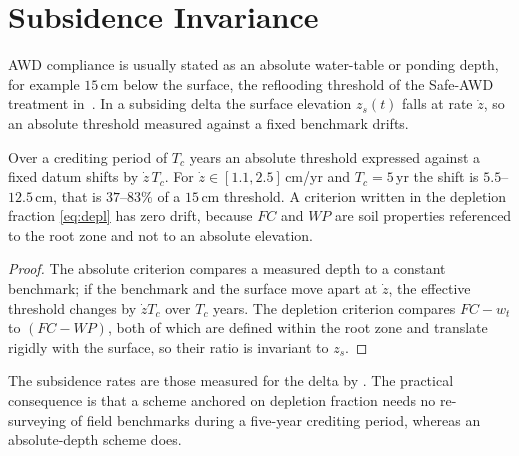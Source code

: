 \section{Subsidence Invariance}
\label{sec:subsidence}

AWD compliance is usually stated as an absolute water-table or ponding depth,
for example $15$\,cm below the surface, the reflooding threshold of the Safe-AWD
treatment in~\cite{balaine2019}. In a subsiding delta
the surface elevation $z_s(t)$ falls at rate $\dot z$, so an absolute threshold
measured against a fixed benchmark drifts.

\begin{proposition}
\label{prop:subsid}
Over a crediting period of $T_c$ years an absolute threshold expressed against
a fixed datum shifts by $\dot z\,T_c$. For $\dot z\in[1.1,2.5]$\,cm/yr and
$T_c=5$\,yr the shift is $5.5$--$12.5$\,cm, that is $37$--$83\%$ of a
$15$\,cm threshold. A criterion written in the depletion fraction
\eqref{eq:depl} has zero drift, because $FC$ and $WP$ are soil properties
referenced to the root zone and not to an absolute elevation.
\end{proposition}

\begin{proof}
The absolute criterion compares a measured depth to a constant benchmark; if
the benchmark and the surface move apart at $\dot z$, the effective threshold
changes by $\dot z T_c$ over $T_c$ years. The depletion criterion compares
$FC-w_t$ to $(FC-WP)$, both of which are defined within the root zone and
translate rigidly with the surface, so their ratio is invariant to $z_s$.
\end{proof}

The subsidence rates are those measured for the delta by
\cite{minderhoud2017}. The practical consequence is that a scheme anchored on
depletion fraction needs no re-surveying of field benchmarks during a five-year
crediting period, whereas an absolute-depth scheme does.

